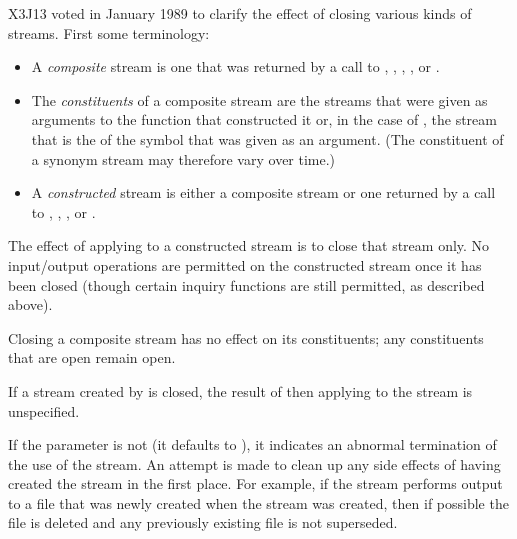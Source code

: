 \begin{defun}[Function]
\begin{new}
X3J13 voted in January 1989
to clarify the effect of closing various
kinds of streams.  First some terminology:
\begin{itemize}
\item
A \emph{composite} stream is one that was returned by a call to
,
,
,
,
or .

\item
The \emph{constituents} of a composite stream are the streams that were given
as arguments to the function that constructed it or, in the case of
, the stream that is the  of
the symbol that was given as an argument.  (The constituent of
a synonym stream may therefore vary over time.)

\item
A \emph{constructed} stream is either a composite stream or one returned
by a call to , ,
, or
.
\end{itemize}

The effect of applying  to a constructed stream is to close
that stream only.  No input/output operations are permitted on the
constructed stream once it has been closed (though certain inquiry
functions are still permitted, as described above).

Closing a composite stream has no effect on its constituents;
any constituents that are open remain open.

If a stream created by  is closed,
the result of then applying  to the
stream is unspecified.
\end{new}

If the  parameter is not {\false} (it defaults to {\false}), it
indicates an abnormal termination of the use of the stream.  An attempt
is made to clean up any side effects of having created the stream in the
first place.  For example, if the stream performs output to a file
that was newly created when the stream was created, then if possible the
file is deleted and any previously existing file is not superseded.
\end{defun}

